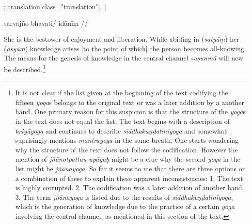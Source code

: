 \documentclass[12pt]{article}%
\begin{document}
\begin{alignment}[
    texts=edition[class="edition"];
    translation[class="translation"],
  ]
\begin{edition}
\begin{prose}
    sarvajño bhavati/ idānīṃ
    //
  \end{prose}
  \end{edition}
   \begin{translation}
      \begin{tlate}She  is the bestower of enjoyment and liberation. While abiding in (\textit{satyāṃ}) her (\textit{asyāṃ}) knowledge arises [to the point of which] the person becomes all-knowing. The means for the genesis of knowledge in the central channel \textit{suṣumnā} will now be described.\footnote{It is not clear if the list given at the beginning of the text codifying the fifteen \textit{yoga}s belongs to the original text or was a later addition by a another hand. One primary reason for this suspicion is that the structure of the \textit{yoga}s in the text does not equal the list. The text begins with a description of \textit{kriyāyoga} and continues to describe \textit{siddhakuṇḍaliniyoga} and somewhat suprisingly mentions \textit{mantrayoga} in the same breath. One starts wondering why the structure of the text does not follow the codification. However the mention of \textit{jñānotpattau upāyaḥ} might be a clue why the second \textit{yoga} in the list might be \textit{jñānayoga}. So far it seems to me that there are three options or a combination of these to explain these apparent inconsistencies: 1. The text is highly corrupted. 2. The codification was a later addition of another hand. 3. The term \textit{jñānayoga} is listed due to the results of \textit{siddhakuṇḍalinīyoga}, which is the generation of knowledge due to the practice of a certain \textit{yoga} involving the central channel, as mentioned in this section of the text.}\end{tlate}
   \end{translation}
   \end{alignment}
\end{document}
